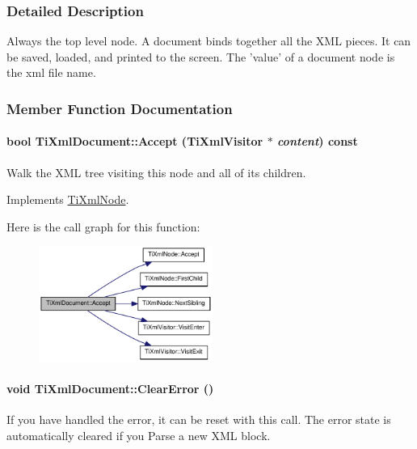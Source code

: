 \subsubsection{Detailed Description}
Always the top level node. A document binds together all the XML pieces. It can be saved, loaded, and printed to the screen. The 'value' of a document node is the xml file name. 

\subsubsection{Member Function Documentation}
\hypertarget{class_ti_xml_document_a3daab2f472418ef66315750202f762ae}{
\paragraph[{Accept}]{\setlength{\rightskip}{0pt plus 5cm}bool TiXmlDocument::Accept ({\bf TiXmlVisitor} $\ast$ {\em content}) const}\hfill}
\label{class_ti_xml_document_a3daab2f472418ef66315750202f762ae}
Walk the XML tree visiting this node and all of its children. 

Implements \hyperlink{class_ti_xml_node_acc0f88b7462c6cb73809d410a4f5bb86}{TiXmlNode}.

Here is the call graph for this function:\nopagebreak
\begin{figure}[H]
\begin{center}
\leavevmode
\includegraphics[width=161pt]{class_ti_xml_document_a3daab2f472418ef66315750202f762ae_cgraph}
\end{center}
\end{figure}
\hypertarget{class_ti_xml_document_ac66b8c28db86363315712a3574e87c35}{
\paragraph[{ClearError}]{\setlength{\rightskip}{0pt plus 5cm}void TiXmlDocument::ClearError ()}\hfill}
\label{class_ti_xml_document_ac66b8c28db86363315712a3574e87c35}
If you have handled the error, it can be reset with this call. The error state is automatically cleared if you Parse a new XML block. 

